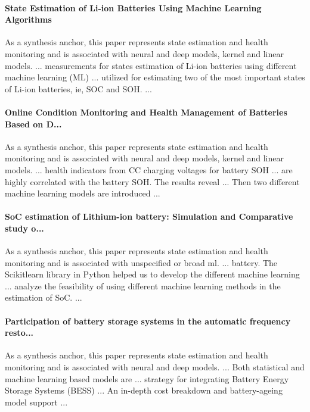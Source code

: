 \documentclass[journal]{IEEEtran}
\begin{document}
\paragraph{State Estimation of Li-ion Batteries Using Machine Learning Algorithms} As a synthesis anchor, this paper represents state estimation and health monitoring and is associated with neural and deep models, kernel and linear models. ... measurements for states estimation of Li-ion batteries using different machine learning (ML) ... utilized for estimating two of the most important states of Li-ion batteries, ie, SOC and SOH. ... \cite{stateestimationof2023}

\paragraph{Online Condition Monitoring and Health Management of Batteries Based on D...} As a synthesis anchor, this paper represents state estimation and health monitoring and is associated with neural and deep models, kernel and linear models. ... health indicators from CC charging voltages for battery SOH ... are highly correlated with the battery SOH. The results reveal ... Then two different machine learning models are introduced ... \cite{onlineconditionmonitorin2022}

\paragraph{SoC estimation of Lithium-ion battery: Simulation and Comparative study o...} As a synthesis anchor, this paper represents state estimation and health monitoring and is associated with unspecified or broad ml. ... battery. The Scikitlearn library in Python helped us to develop the different machine learning ... analyze the feasibility of using different machine learning methods in the estimation of SoC. ... \cite{socestimationof2023}

\paragraph{Participation of battery storage systems in the automatic frequency resto...} As a synthesis anchor, this paper represents state estimation and health monitoring and is associated with neural and deep models. ... Both statistical and machine learning based models are ... strategy for integrating Battery Energy Storage Systems (BESS) ... An in-depth cost breakdown and battery-ageing model support ... \cite{participationofbattery2020}
\end{document}

